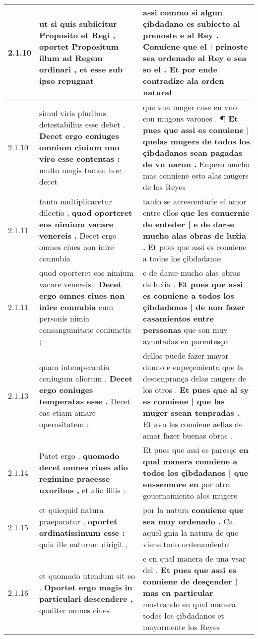 \begin{tabular}{|p{1cm}|p{6.5cm}|p{6.5cm}|}
2.1.10 & ut si quis subiicitur Proposito et Regi , \textbf{ oportet Propositum illum ad Regem ordinari , } et esse sub ipso repugnat & assi commo si algun çibdadano es subiecto al preuoste e al Rey . \textbf{ Conuiene que el | prinoste sea ordenado al Rey e sea so el . } Et por ende contradize ala orden natural \\\hline
2.1.10 & simul viris pluribus detestabilius esse debet . \textbf{ Decet ergo coniuges omnium ciuium uno viro esse contentas : } multo magis tamen hoc decet & que vna muger case en vno con mugons varones . \textbf{ ¶ Et pues que assi es conuiene | quelas mugers de todos los çibdadanos sean pagadas de vn uaron . } Enpero mucho mas conuiene esto alas mugers de los Reyes \\\hline
2.1.11 & tanta multiplicaretur dilectio , \textbf{ quod oporteret eos nimium vacare venereis . } Decet ergo omnes ciues non inire connubia & tanto se acrescentarie el amor entre ellos \textbf{ que les conuernie de enteder | e de darse mucho alas obras de lux̉ia . } Et pues que assi es conuiene a todos los çibdadanos \\\hline
2.1.11 & quod oporteret eos nimium vacare venereis . \textbf{ Decet ergo omnes ciues non inire connubia } cum personis nimia consanguinitate coniunctis ; & e de darse mucho alas obras de lux̉ia . \textbf{ Et pues que assi es conuiene a todos los çibdadanos | de non fazer casamientos entre perssonas } que son muy ayuntadas en parentesço \\\hline
2.1.13 & quam intemperantia coniugum aliorum . \textbf{ Decet ergo coniuges temperatas esse . } Decet eas etiam amare operositatem : & dellos puede fazer mayor danno e enpeçemiento que la destenprança delas mugers de los otros . \textbf{ Et pues que al sy es conuiene | que las muger ssean tenpradas . } Et avn les conuiene aellas de amar fazer buenas obras . \\\hline
2.1.14 & Patet ergo , \textbf{ quomodo decet omnes ciues alio regimine praeesse uxoribus , } et alio filiis : & Et pues que assi es paresçe \textbf{ en qual manera conuiene a todos los çibdadanos | que enssennore en } por otro gouernamiento alos mugers \\\hline
2.1.15 & et quicquid natura praeparatur , \textbf{ oportet ordinatissimum esse : } quia ille naturam dirigit , & por la natura \textbf{ conuiene que sea muy ordenado . } Ca aquel gnia la natura de que viene todo ordenamiento \\\hline
2.1.16 & et quomodo utendum sit eo . \textbf{ Oportet ergo magis in particulari descendere , } qualiter omnes ciues & e en qual manera de una vsar del . \textbf{ Et pues que assi es conuiene de desçender | mas en particular } mostrando en qual manera todos los çibdadanos et mayormente los Reyes \\\hline

\end{tabular}
